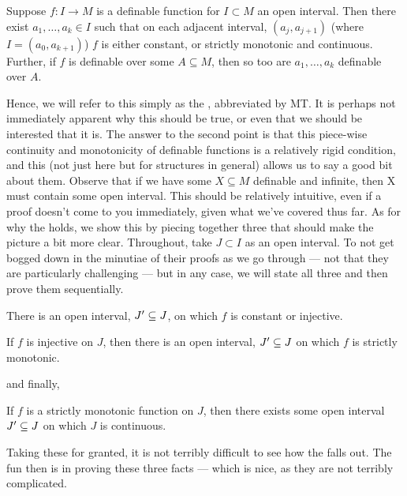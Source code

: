 \begin{theorem}[The \MT]
	\label{thm:monotonicity}
  Suppose $f \colon I \to M$ is a definable function for $I \subset M$ an open interval. Then there exist $a_1, \hdots, a_k \in I$ such that on each adjacent interval, $(a_j, a_{j+1})$ (where $I = (a_0, a_{k+1})$) $f$ is either constant, or strictly monotonic and continuous. Further, if $f$ is definable over some $A \subseteq M$, then so too are $a_1, \hdots, a_{k}$ definable over $A$.
\end{theorem}

Hence, we will refer to this simply as the \Mt, abbreviated by MT. It is perhaps not immediately apparent why this should be true, or even that we should be interested that it is. The answer to the second point is that this piece-wise continuity and monotonicity of definable functions is a relatively rigid condition, and this (not just here but for structures in general) allows us to say a good bit about them. Observe that if we have some $X \subseteq M$ definable and infinite, then X must contain some open interval. This should be relatively intuitive, even if a proof doesn't come to you immediately, given what we've covered thus far. As for why the \Mt holds, we show this by piecing together three \lemmas that should make the picture a bit more clear. Throughout, take $J \subset I$ as an open interval. To not get bogged down in the minutiae of their proofs as we go through — not that they are particularly challenging — but in any case, we will state all three and then prove them sequentially.

\begin{lemma}
\label{lemma:monotonic-1}
  There is an open interval, $J^{\prime} \subseteq J$, on which $f$ is constant or injective.
\end{lemma}

\begin{lemma}
\label{lemma:monotonic-2}
  If $f$ is injective on $J$, then there is an open interval, $J^{\prime} \subseteq J$ on which $f$ is strictly monotonic.
\end{lemma}

and finally,

\begin{lemma}
\label{lemma:monotonic-3}
  If $f$ is a strictly monotonic function on $J$, then there exists some open interval $ J^{\prime} \subseteq J$ on which $J$ is continuous.
\end{lemma}

Taking these \lemmas for granted, it is not terribly difficult to see how the \Mt falls out. The fun then is in proving these three facts — which is nice, as they are not terribly complicated.

